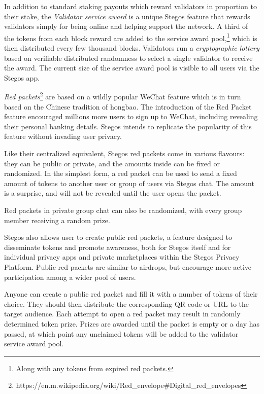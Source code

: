 \documentclass[8pt,fleqn,openany]{book}
\begin{document}
	In addition to standard staking payouts which reward validators in proportion to their stake, the \textit{Validator service award} is a unique Stegos feature that rewards validators simply for being online and helping support the network. A third of the tokens from each block reward are added to the service award pool,\footnote{Along with any tokens from expired red packets.} which is then distributed every few thousand blocks. Validators run a \textit{cryptographic lottery} based on verifiable distributed randomness to select a single validator to receive the award. The current size of the service award pool is visible to all users via the Stegos app.
	
	\textit{Red packets}\footnote{https://en.m.wikipedia.org/wiki/Red\_envelope\#Digital\_red\_envelopes} are based on a wildly popular WeChat feature which is in turn based on the Chinese tradition of hongbao. The introduction of the Red Packet feature encouraged millions more users to sign up to WeChat, including revealing their personal banking details. Stegos intends to replicate the popularity of this feature without invading user privacy.
	
	Like their centralized equivalent, Stegos red packets come in various flavours: they can be public or private, and the amounts inside can be fixed or randomized. In the simplest form, a red packet can be used to send a fixed amount of tokens to another user or group of users via Stegos chat. The amount is a surprise, and will not be revealed until the user opens the packet.
	
	Red packets in private group chat can also be randomized, with every group member receiving a random prize. 
	
	Stegos also allows user to create public red packets, a feature designed to disseminate tokens and promote awareness, both for Stegos itself and for individual privacy apps and private marketplaces within the Stegos Privacy Platform. Public red packets are similar to airdrops, but encourage more active participation among a wider pool of users. 
	
	Anyone can create a public red packet and fill it with a number of tokens of their choice. They should then distribute the corresponding QR code or URL to the target audience. Each attempt to open a red packet may result in randomly determined token prize. Prizes are awarded until the packet is empty or a day has passed, at which point any unclaimed tokens will be added to the validator service award pool.
	
\end{document}
